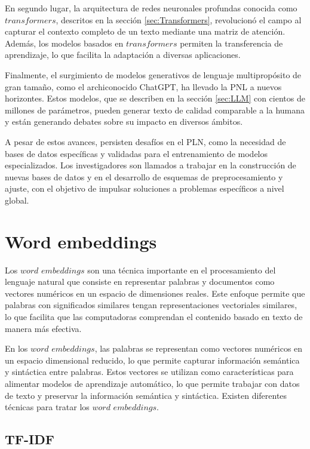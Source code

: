 En segundo lugar, la arquitectura de redes neuronales profundas conocida como $transformers$, descritos en la sección \ref{sec:Transformers}, revolucionó el campo al capturar el contexto completo de un texto mediante una matriz de atención. Además, los modelos basados en $transformers$ permiten la transferencia de aprendizaje, lo que facilita la adaptación a diversas aplicaciones.

Finalmente, el surgimiento de modelos generativos de lenguaje multipropósito de gran tamaño, como el archiconocido ChatGPT, ha llevado la PNL a nuevos horizontes. Estos modelos, que se describen en la sección \ref{sec:LLM} con cientos de millones de parámetros, pueden generar texto de calidad comparable a la humana y están generando debates sobre su impacto en diversos ámbitos. 

A pesar de estos avances, persisten desafíos en el PLN, como la necesidad de bases de datos específicas y validadas para el entrenamiento de modelos especializados. Los investigadores son llamados a trabajar en la construcción de nuevas bases de datos y en el desarrollo de esquemas de preprocesamiento y ajuste, con el objetivo de impulsar soluciones a problemas específicos a nivel global.

\section{Word embeddings}
\label{sec:WordEmbeddings}

Los $word$ $embeddings$ \citep{wordEmbeddings} son una técnica importante en el procesamiento del lenguaje natural que consiste en representar palabras y documentos como vectores numéricos en un espacio de dimensiones reales. Este enfoque permite que palabras con significados similares tengan representaciones vectoriales similares, lo que facilita que las computadoras comprendan el contenido basado en texto de manera más efectiva.

En los $word$ $embeddings$, las palabras se representan como vectores numéricos en un espacio dimensional reducido, lo que permite capturar información semántica y sintáctica entre palabras. Estos vectores se utilizan como características para alimentar modelos de aprendizaje automático, lo que permite trabajar con datos de texto y preservar la información semántica y sintáctica. Existen diferentes técnicas para tratar los $word$ $embeddings$.

\subsection{TF-IDF}

